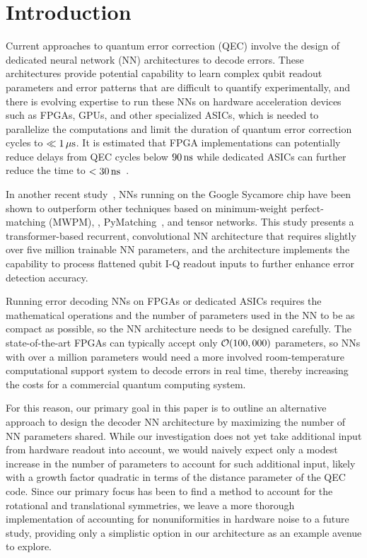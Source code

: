 \section{Introduction}

Current approaches to quantum error correction (QEC) involve the design of dedicated neural network (NN) architectures to decode errors. These architectures provide potential capability to learn complex qubit readout parameters and error patterns that are difficult to quantify experimentally, and there is evolving expertise to run these NNs on hardware acceleration devices such as FPGAs, GPUs, and other specialized ASICs, which is needed to parallelize the computations and limit the duration of quantum error correction cycles to $\ll 1\,\mu\text{s}$. It is estimated that FPGA implementations can potentially reduce delays from QEC cycles below $90\,\text{ns}$ while dedicated ASICs can further reduce the time to $<30\,\text{ns}$~\cite{Overwater:2022qwb}.

In another recent study~\cite{Bausch:2023jgi}, NNs running on the Google Sycamore chip have been shown to outperform other techniques based on minimum-weight perfect-matching (MWPM), \eg, PyMatching~\cite{Higgott:2023}, and tensor networks. This study presents a transformer-based recurrent, convolutional NN architecture that requires slightly over five million trainable NN parameters, and the architecture implements the capability to process flattened qubit I-Q readout inputs to further enhance error detection accuracy.

Running error decoding NNs on FPGAs or dedicated ASICs requires the mathematical operations and the number of parameters used in the NN to be as compact as possible, so the NN architecture needs to be designed carefully. The state-of-the-art FPGAs can typically accept only $\mathcal{O}(100,000)$ parameters, so NNs with over a million parameters would need a more involved room-temperature computational support system to decode errors in real time, thereby increasing the costs for a commercial quantum computing system.

For this reason, our primary goal in this paper is to outline an alternative approach to design the decoder NN architecture by maximizing the number of NN parameters shared. While our investigation does not yet take additional input from hardware readout into account, we would naively expect only a modest increase in the number of parameters to account for such additional input, likely with a growth factor quadratic in terms of the distance parameter of the QEC code. Since our primary focus has been to find a method to account for the rotational and translational symmetries, we leave a more thorough implementation of accounting for nonuniformities in hardware noise to a future study, providing only a simplistic option in our architecture as an example avenue to explore.

